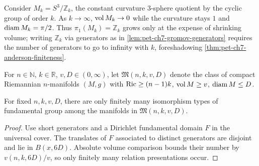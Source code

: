 \begin{example}
  \label{ex:pet-ch7-lens-spaces-example}

  Consider $M_k=S^3/\mathbb{Z}_k$, the constant curvature $3$-sphere quotient by
  the cyclic group of order $k$. As $k\to\infty$, $\operatorname{vol} M_k\to0$ while the
  curvature stays $1$ and $\operatorname{diam} M_k=\pi/2$. Thus $\pi_1(M_k)=\mathbb{Z}_k$ grows
  only at the expense of shrinking volume; writing $\mathbb{Z}_k$ via generators as
  in \cref{lem:pet-ch7-gromov-generators} requires the number of generators to
  go to infinity with $k$, foreshadowing \cref{thm:pet-ch7-anderson-finiteness}.
\end{example}

\begin{definition}
  \label{def:pet-ch7-manifold-class}

  For $n\in\mathbb{N}$, $k\in\mathbb{R}$, $v,D\in(0,\infty)$, let
  $\mathfrak{M}(n,k,v,D)$ denote the class of compact Riemannian $n$-manifolds
  $(M,g)$ with $\operatorname{Ric}\ge(n-1)k$, $\operatorname{vol} M\ge v$, $\operatorname{diam} M\le D$.
\end{definition}

\begin{theorem}
  \label{thm:pet-ch7-anderson-finiteness}

  For fixed $n,k,v,D$, there are only finitely many isomorphism types of
  fundamental group among the manifolds in $\mathfrak{M}(n,k,v,D)$.
\end{theorem}
\begin{proof}
  \sketch
  Use short generators and a Dirichlet fundamental domain \(F\) in the universal cover. The translates of \(F\) associated to distinct generators are disjoint and lie in \(B(x,6D)\). Absolute volume comparison bounds their number by \(v(n,k,6D)/v\), so only finitely many relation presentations occur.
\end{proof}

